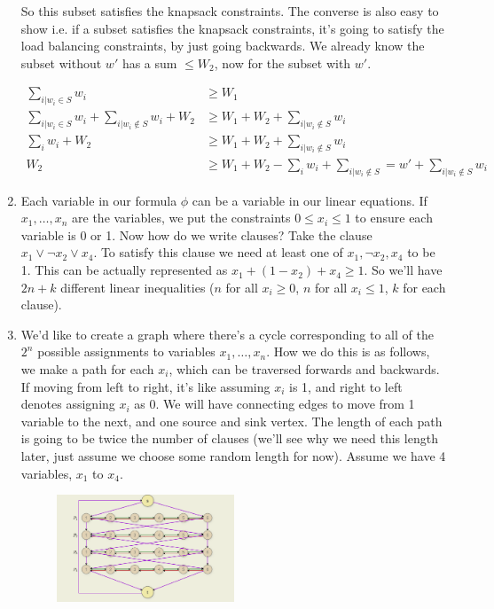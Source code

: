 \documentclass[12pt]{report}
\begin{document}
\begin{enumerate}[label=\textbf{\arabic*.}]
    So this subset satisfies the knapsack constraints. The converse is also easy to show i.e. if a subset satisfies the knapsack constraints, it's
    going to satisfy the load balancing constraints, by just going backwards. We already know the subset without $w'$ has a sum $\leq W_2$, now for the 
    subset with $w'$.

    \begin{align*}
        \sum_{i| w_i \in S} w_i &\geq W_1 \\
        \sum_{i| w_i \in S} w_i + \sum_{i| w_i \notin S} w_i + W_2 &\geq W_1 + W_2 + \sum_{i| w_i \notin S} w_i \\
        \sum_i w_i + W_2 &\geq W_1 + W_2 + \sum_{i| w_i \notin S} w_i \\
        W_2 &\geq W_1 + W_2 - \sum_i w_i + \sum_{i| w_i \notin S} = w' + \sum_{i| w_i \notin S} w_i
    \end{align*}

    \item Each variable in our formula $\phi$ can be a variable in our linear equations. If $x_1, \dots, x_n$ are the variables, we put the 
    constraints $0 \leq x_i \leq 1$ to ensure each variable is 0 or 1. Now how do we write clauses? Take the clause $x_1 \lor \lnot x_2 \lor x_4$.
    To satisfy this clause we need at least one of $x_1, \lnot x_2, x_4$ to be 1. This can be actually represented as $x_1 + (1 - x_2) + x_4 \geq 1$.
    So we'll have $2n + k$ different linear inequalities ($n$ for all $x_i \geq 0$, $n$ for all $x_i \leq 1$, $k$ for each clause).

    \item We'd like to create a graph where there's a cycle corresponding to all of the $2^n$ possible assignments to variables $x_1, \dots, x_n$.
    How we do this is as follows, we make a path for each $x_i$, which can be traversed forwards and backwards. If moving from left to right, it's
    like assuming $x_i$ is 1, and right to left denotes assigning $x_i$ as 0. We will have connecting edges to move from 1 variable to the next,
    and one source and sink vertex. The length of each path is going to be twice the number of clauses (we'll see why we need this length later,
    just assume we choose some random length for now). Assume we have 4 variables, $x_1$ to $x_4$.

    \begin{figure}[H]
        \centering
        \includegraphics[width=0.5\textwidth]{Hamiltonian1.png}  
    \end{figure}


\end{enumerate}
\end{document}
